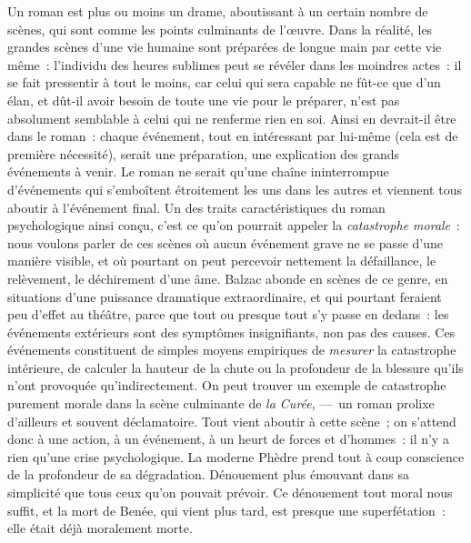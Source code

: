 \documentclass[french,twoside]{book} %
\begin{document}
Un roman est plus ou moins un drame, aboutissant à un certain nombre de scènes, qui sont comme les points culminants de l’œuvre. Dans la réalité, les grandes scènes d’une vie humaine sont préparées de longue main par cette vie même : l’individu des heures sublimes peut se révéler dans les moindres actes : il se fait pressentir à tout le moins, car celui qui sera capable ne fût-ce que d’un élan, et dût-il avoir besoin de toute une vie pour le préparer, n’est pas absolument semblable à celui qui ne renferme rien en soi. Ainsi en devrait-il être dans le roman : chaque événement, tout en intéressant par lui-même (cela est de première nécessité), serait une préparation, une explication des grands événements à venir. Le roman ne serait qu’une chaîne ininterrompue d’événements qui s’emboîtent étroitement les uns dans les autres et viennent tous aboutir à l’événement final. Un des traits caractéristiques du roman psychologique ainsi conçu, c’est ce qu’on pourrait appeler la \emph{catastrophe morale} : nous voulons parler de ces scènes où aucun événement grave ne se passe d’une manière visible, et où pourtant on peut percevoir nettement la défaillance, le relèvement, le déchirement d’une âme. Balzac abonde en scènes de ce genre, en situations d’une puissance dramatique extraordinaire, et qui pourtant feraient peu d’effet au théâtre, parce que tout ou presque tout s’y passe en dedans : les événements extérieurs sont des symptômes insignifiants, non pas des causes. Ces événements constituent de simples moyens empiriques de \emph{mesurer} la catastrophe intérieure, de calculer la hauteur de la chute ou la profondeur de la blessure qu’ils n’ont provoquée qu’indirectement. On peut trouver un exemple de catastrophe purement morale dans la scène culminante de \emph{la Curée}, — un roman prolixe d’ailleurs et souvent déclamatoire. Tout vient aboutir à cette scène ; on s’attend donc à une action, à un événement, à un heurt de forces et d’hommes : il n’y a rien qu’une crise psychologique. La moderne Phèdre prend tout à coup conscience de la profondeur de sa dégradation. Dénouement plus émouvant dans sa simplicité que tous ceux qu’on pouvait prévoir. Ce dénouement tout moral nous suffit, et la mort de Benée, qui vient plus tard, est presque une superfétation : elle était déjà moralement morte.\par
\end{document}
